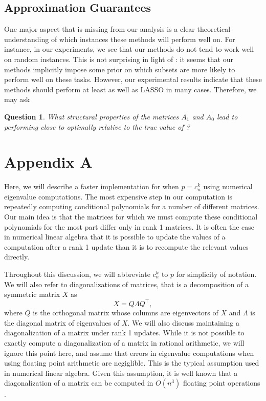 \documentclass{amsart}
\newtheorem{question}[theorem]{Question}
\theoremstyle{definition}
\begin{document}
\subsection{Approximation Guarantees}
One major aspect that is missing from our analysis is a clear theoretical understanding of which instances these methods will perform well on.
For instance, in our experiments, we see that our methods do not tend to work well on random instances.
This is not surprising in light of : it seems that our methods implicitly impose some prior on which subsets are more likely to perform well on these tasks.
However, our experimental results indicate that these methods should perform at least as well as LASSO in many cases.
Therefore, we may ask
\begin{question}
    What structural properties of the matrices $A_1$ and $A_0$ lead to  performing close to optimally relative to the true value of ?
\end{question}
\section{Appendix A}
Here, we will describe a faster implementation for  when $p = c^k_n$ using numerical eigenvalue computations. The most expensive step in our computation is repeatedly computing conditional polynomials for a number of different matrices. Our main idea is that the matrices for which we must compute these conditional polynomials for the most part differ only in rank 1 matrices. It is often the case in numerical linear algebra that it is possible to update the values of a computation after a rank 1 update than it is to recompute the relevant values directly.

Throughout this discussion, we will abbreviate $c^k_n$ to $p$ for simplicity of notation.
We will also refer to diagonalizations of matrices, that is a decomposition of a symmetric matrix $X$ as
\[
    X = Q\Lambda Q^{\intercal},
\]
where $Q$ is the orthogonal matrix whose columns are eigenvectors of $X$ and $\Lambda$ is the diagonal matrix of eigenvalues of $X$.
We will also discuss maintaining a diagonalization of a matrix under rank 1 updates.
While it is not possible to exactly compute a diagonalization of a matrix in rational arithmetic, we will ignore this point here, and assume that errors in eigenvalue computations when using floating point arithmetic are negiglible.
This is the typical assumption used in numerical linear algebra.
Given this assumption, it is well known that a diagonalization of a matrix can be computed in $O(n^3)$ floating point operations \cite{TODO}.
\end{document}

